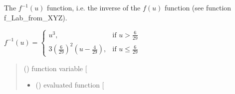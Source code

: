 \documentclass[letterpaper,10pt,english]{sphinxmanual}
\begin{document}

\begin{fulllineitems}
\label{\detokenize{07_colors:skinoptics.colors.inv_f_Lab_from_XYZ}}
\pysigstartsignatures
{}
\pysigstopsignatures
\sphinxAtStartPar
The \(f^{-1}(u)\) function, i.e. the inverse of the \(f(u)\) function (see function f\_Lab\_from\_XYZ).

\sphinxAtStartPar
\(f^{-1}(u) = \left\{ 
\begin{matrix}
u^3, & \mbox{if }  u > \frac{6}{29} \\
3\left(\frac{6}{29}\right)^2\left(u - \frac{4}{29} \right), & \mbox{if } u \le \frac{6}{29}
\end{matrix}\right.\)
\begin{quote}\begin{description}
\sphinxAtStartPar
{} () \textendash{} function variable {[}\sphinxhyphen{}{]}

\sphinxAtStartPar
\begin{itemize}
\item {} 
\sphinxAtStartPar
{} () \textendash{} evaluated function {[}\sphinxhyphen{}{]}

\end{itemize}


\end{description}\end{quote}

\end{fulllineitems}

\end{document}
